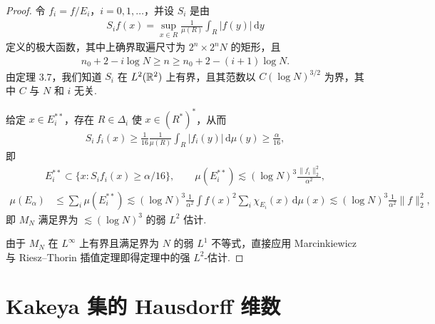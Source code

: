 \begin{proof}
令 $f_i = f/E_i$，$i = 0, 1, \ldots$，并设 $S_i$ 是由
\begin{align*}
  S_{i}f(x)=\sup_{x\in R}\frac{1}{\mu(R)}\int_{R}\left|f(y)\right|\,\mathrm{d}y
\end{align*}
定义的极大函数，其中上确界取遍尺寸为 $2^n \times 2^n N$ 的矩形，且
\begin{align*}
  n_{0}+2-i\log N\geq n\geq n_{0}+2-\left(i+1\right)\log N.
\end{align*}
由定理 3.7，我们知道 $S_i$ 在 $L^2(\mathbb{R}^2)$ 上有界，且其范数以 $C(\log N)^{3/2}$ 为界，其中 $C$ 与 $N$ 和 $i$ 无关.

给定 $x \in E_i^{**}$，存在 $R \in \Delta_i$ 使 $x \in (R^*)^*$，从而
\begin{align*}
  S_{i}\,f_{i}(x)\geq\frac{1}{16}\frac{1}{\mu(R)}\int_{R}\left|f_{i}(y)\right|\,\mathrm{d}\mu(y)\geq\frac{\alpha}{16},
\end{align*}
即
\begin{align*}
  E_{i}^{**}\subset\{x:S_{i}f_{i}(x)\geq\alpha/16\},\qquad
  \mu(E_{i}^{**})\lesssim(\log N)^{3}\frac{\|f_{i}\|_{2}^{2}}{\alpha^{2}},
\end{align*}
\begin{align*}
  \mu(E_\alpha)
  &\leq\sum_{i}\mu(E_{i}^{**})
  \lesssim(\log N)^{3}\frac{1}{\alpha^{2}}\int f(x)^{2}\sum_{i}\chi_{E_{i}}(x)\,\mathrm{d}\mu(x)
  \lesssim(\log N)^{3}\frac{1}{\alpha^{2}}\|f\|_{2}^{2},
\end{align*}
即 $M_N$ 满足界为 $\lesssim (\log N)^3$ 的弱 $L^2$ 估计.

由于 $M_N$ 在 $L^\infty$ 上有界且满足界为 $N$ 的弱 $L^1$ 不等式，直接应用 Marcinkiewicz 与 Riesz--Thorin 插值定理即得定理中的强 $L^2$-估计.
\end{proof}

\section{Kakeya 集的 Hausdorff 维数}

